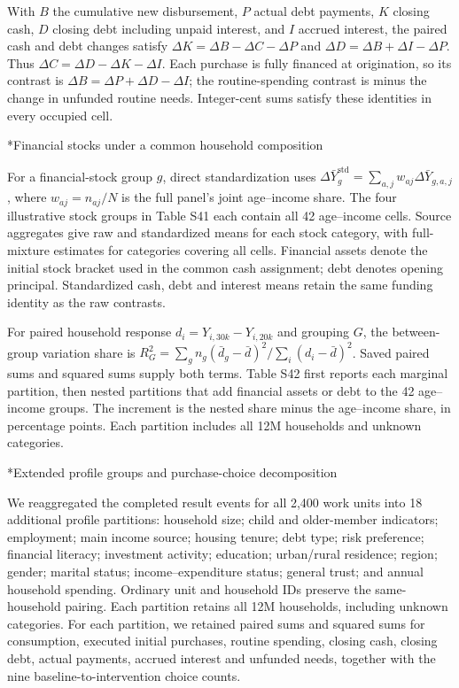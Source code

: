 \documentclass[10pt]{article}
\makeatletter
\renewcommand\subsection{\@startsection{subsection}{2}{\z@}{-1.7ex plus -.5ex minus -.2ex}{.6ex plus .2ex}{\normalfont\normalsize\mdseries}}
\makeatother
\begin{document}
With $B$ the cumulative new disbursement, $P$ actual debt payments, $K$ closing cash, $D$ closing debt including unpaid interest, and $I$ accrued interest, the paired cash and debt changes satisfy $\Delta K=\Delta B-\Delta C-\Delta P$ and $\Delta D=\Delta B+\Delta I-\Delta P$. Thus $\Delta C=\Delta D-\Delta K-\Delta I$. Each purchase is fully financed at origination, so its contrast is $\Delta B=\Delta P+\Delta D-\Delta I$; the routine-spending contrast is minus the change in unfunded routine needs. Integer-cent sums satisfy these identities in every occupied cell.


\subsection*{Financial stocks under a common household composition}

For a financial-stock group $g$, direct standardization uses $\Delta\bar Y_g^{\mathrm{std}}=\sum_{a,j}w_{aj}\Delta\bar Y_{g,a,j}$, where $w_{aj}=n_{aj}/N$ is the full panel's joint age--income share. The four illustrative stock groups in Table S41 each contain all 42 age--income cells. Source aggregates give raw and standardized means for each stock category, with full-mixture estimates for categories covering all cells. Financial assets denote the initial stock bracket used in the common cash assignment; debt denotes opening principal. Standardized cash, debt and interest means retain the same funding identity as the raw contrasts.

For paired household response $d_i=Y_{i,30k}-Y_{i,20k}$ and grouping $G$, the between-group variation share is $R_G^2=\sum_g n_g(\bar d_g-\bar d)^2/\sum_i(d_i-\bar d)^2$. Saved paired sums and squared sums supply both terms. Table S42 first reports each marginal partition, then nested partitions that add financial assets or debt to the 42 age--income groups. The increment is the nested share minus the age--income share, in percentage points. Each partition includes all 12M households and unknown categories.

\subsection*{Extended profile groups and purchase-choice decomposition}

We reaggregated the completed result events for all 2,400 work units into 18 additional profile partitions: household size; child and older-member indicators; employment; main income source; housing tenure; debt type; risk preference; financial literacy; investment activity; education; urban/rural residence; region; gender; marital status; income--expenditure status; general trust; and annual household spending. Ordinary unit and household IDs preserve the same-household pairing. Each partition retains all 12M households, including unknown categories. For each partition, we retained paired sums and squared sums for consumption, executed initial purchases, routine spending, closing cash, closing debt, actual payments, accrued interest and unfunded needs, together with the nine baseline-to-intervention choice counts.
\end{document}
